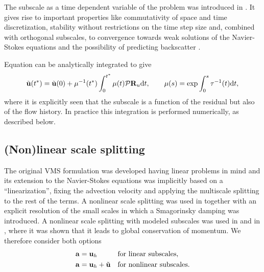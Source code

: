 The subscale as a time dependent variable of the problem was introduced in \cite{codina_stabilized_2002,codina_time_2007}. It gives rise to important properties like commutativity of space and time discretization, stability without restrictions on the time step size \cite{codina_time_2007,Badia2009a} and, combined with orthogonal subscales, to convergence towards weak solutions of the Navier-Stokes equations \cite{Badia2013Convergence} and the possibility of predicting backscatter \cite{Codina-chap-2011,Principe2009}. 

Equation  can be analytically integrated to give
\begin{equation}
\label{eq-C2_exact_sgs}
\tilde{{\bf u}}(t^*)=\tilde{{\bf u}}(0) + \mu^{-1}(t^*) \int_0^{t^*} \mu(t) \mathcal{P}{\bf R}_u {\rm d}t, \quad \quad \mu(s)=\exp \int_0^s \tau^{-1}(t){\rm d}t,
\end{equation}
where it is explicitly seen that the subscale is a function of the residual but also of the flow history. In practice this integration is performed numerically, as described below.

\subsection{(Non)linear scale splitting}
\label{subsec-C2_nl}
The original VMS formulation \cite{hughes_multiscale_1995,hughes_variational_1998} was developed having linear problems in mind and its extension to the Navier-Stokes equations was implicitly based on a ``linearization'', fixing the advection velocity and applying the multiscale splitting to the rest of the terms. A nonlinear scale splitting was used in \cite{Hughes2000,hughes_large_2001} together with an explicit resolution of the small scales in which a Smagorinsky damping was introduced. A nonlinear scale splitting with modeled subscales was used in \cite{codina_stabilized_2002, bazilevs_variational_2007} and in \cite{codina_time_2007}, where it was shown that it leads to global conservation of momentum. We therefore consider both options
\begin{align}
\label{eq-C2_a_lin}
&{\bf a}={\bf u}_h&&\mbox{for linear subscales},\\
\label{eq-C2_a_nl}
&{\bf a}={\bf u}_h+\tilde{{\bf u}}&&\mbox{for nonlinear subscales}.
\end{align}


